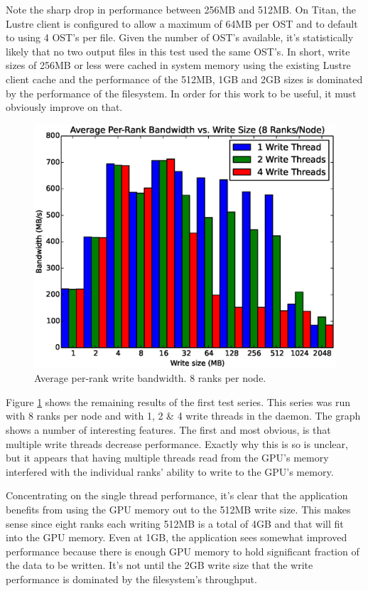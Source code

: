 Note the sharp drop in performance between 256MB and 512MB.  On Titan, the Lustre client is configured to allow a maximum of 64MB per OST and to default to using 4 OST's per file.  Given the number of OST's available, it's statistically likely that no two output files in this test used the same OST's.  In short, write sizes of 256MB or less were cached in system memory using the existing Lustre client cache and the performance of the 512MB, 1GB and 2GB sizes is dominated by the performance of the filesystem.  In order for this work to be useful, it must obviously improve on that.

\begin{figure}
\includegraphics[width=\linewidth]{figures/figure_2.eps}
\caption{Average per-rank write bandwidth.  8 ranks per node.} 
\label{fig:results_8_nobars}
\end{figure}

Figure \ref{fig:results_8_nobars} shows the remaining results of the first test series.  This series was run with 8 ranks per node and with 1, 2 \& 4 write threads in the daemon.  The graph shows a number of interesting features.  The first and most obvious, is that multiple write threads decrease performance.  Exactly why this is so is unclear, but it appears that having multiple threads read from the GPU's memory interfered with the individual ranks' ability to write to the GPU's memory.  

Concentrating on the single thread performance, it's clear that the application benefits from using the GPU memory out to the 512MB write size.  This makes sense since eight ranks each writing 512MB is a total of 4GB and that will fit into the GPU memory.  Even at 1GB, the application sees somewhat improved performance because there is enough GPU memory to hold significant fraction of the data to be written.  It's not until the 2GB write size that the write performance is dominated by the filesystem's throughput.

